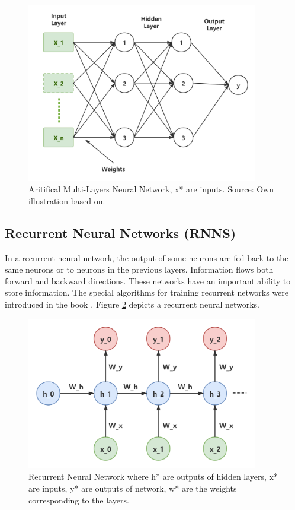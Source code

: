 \begin{figure}[htbp]
\centering
\includegraphics[width=0.9\textwidth]{./images/multi-layer-ann.png}
\caption{Aritifical Multi-Layers Neural Network, x* are inputs. Source: Own illustration based
on\parencite{SAIRAMYA2019253}.}
\label{fig:multi-layer-ann}
\end{figure}

\subsection{Recurrent Neural Networks (RNNS)}
In a recurrent neural network, the output of some neurons are fed back to the same neurons or to neurons in the previous layers\parencite{BASHEER20003}. Information flows both forward and backward directions. These networks have an important ability to store information. The special algorithms for training recurrent networks were introduced in the book \parencite{Hassoun1995}. Figure \ref{fig:recurrent-layer-ann} depicts a recurrent neural networks.

\begin{figure}[htbp]
\centering
\includegraphics[width=0.9\textwidth]{./images/recurrent-layer-ann.png}
\caption{Recurrent Neural Network where h* are outputs of hidden layers, x* are inputs, y* are outputs of network, w* are the weights corresponding to the layers.}
\label{fig:recurrent-layer-ann}
\end{figure}

